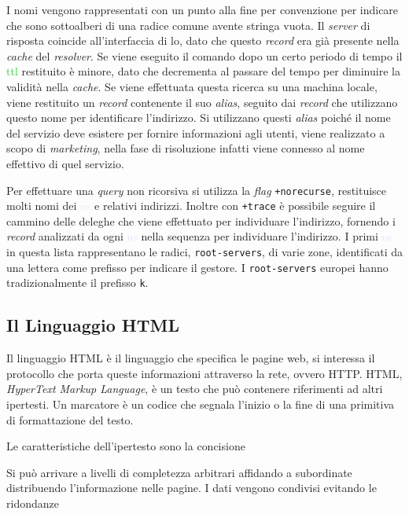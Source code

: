 \documentclass{article}
\numberwithin{equation}{subsection}
\begin{document}
I nomi vengono rappresentati con un punto alla fine per convenzione per indicare che sono sottoalberi di una radice comune avente stringa vuota. 
Il \textit{server} di risposta coincide all'interfaccia di lo, dato che questo \textit{record} era già presente nella \textit{cache} del \textit{resolver}. 
Se viene eseguito il comando dopo un certo periodo di tempo il \textcolor{LimeGreen}{ttl} restituito è minore, dato che decrementa al passare del tempo per diminuire la validità nella \textit{cache}. 
Se viene effettuata questa ricerca su una machina locale, viene restituito un \textit{record} contenente il suo \textit{alias}, seguito dai \textit{record} che utilizzano questo nome per identificare l'indirizzo. Si utilizzano questi \textit{alias} poiché il nome del servizio deve esistere per fornire informazioni agli utenti, viene realizzato a scopo di \textit{marketing}, nella fase di risoluzione infatti viene connesso al nome effettivo di quel servizio. 

Per effettuare una \textit{query} non ricorsiva si utilizza la \textit{flag} \verb|+norecurse|, restituisce molti nomi dei \textcolor{Lavender}{ns} e relativi indirizzi. Inoltre con \verb|+trace| è possibile seguire il cammino delle deleghe che viene effettuato per individuare l'indirizzo, fornendo i \textit{record} analizzati da ogni \textcolor{Lavender}{ns} nella sequenza per individuare l'indirizzo. I primi \textcolor{Lavender}{ns} in questa lista rappresentano le radici, \verb|root-servers|, di varie zone, identificati da una lettera come prefisso per indicare il gestore. I \verb|root-servers| europei hanno tradizionalmente il prefisso \verb|k|. 

\subsection{Il Linguaggio \textcolor{Peach}{HTML}}

Il linguaggio \textcolor{Peach}{HTML} è il linguaggio che specifica le pagine web, si interessa il protocollo che porta queste informazioni attraverso la rete, ovvero \textcolor{NavyBlue}{HTTP}. 
\textcolor{Peach}{HTML}, \textit{HyperText Markup Language}, è un testo che può contenere riferimenti ad altri ipertesti. Un marcatore è un codice che segnala l'inizio o la fine di una primitiva  di 
formattazione del testo. 


Le caratteristiche dell'ipertesto sono la concisione 

Si può arrivare a livelli di completezza arbitrari affidando a subordinate distribuendo l'informazione nelle pagine. 
I dati vengono condivisi evitando le ridondanze 
\end{document}
